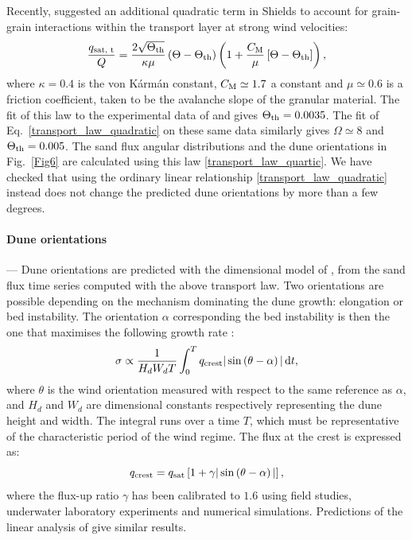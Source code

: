 Recently, \citet{Pahtz2020} suggested an additional quadratic term in Shields to account for grain-grain interactions within the transport layer at strong wind velocities:
%
\begin{equation}
\label{transport_law_quartic}
\frac{q_{\textup{sat, t}}}{Q} = \frac{2\sqrt{\Theta_{\textup{th}}}}{\kappa\mu}\left(\Theta - \Theta_{\textup{th}}\right)\left(1 +\frac{C_{\textup{M}}}{\mu}\left[\Theta - \Theta_{\textup{th}}\right]\right),
\end{equation}
%
where $\kappa = 0.4$ is the von K\'arm\'an constant, $C_{\rm M} \simeq 1.7$ a constant and $\mu \simeq 0.6$ is a friction coefficient, taken to be the avalanche slope of the granular material. The fit of this law to the experimental data of \citet{Creyssels2009} and \citet{Ho2011} gives $\Theta_{\textup{th}} = 0.0035$. The fit of Eq.~\ref{transport_law_quadratic} on these same data similarly gives $\Omega \simeq 8$ and $\Theta_{\textup{th}} = 0.005$. The sand flux angular distributions and the dune orientations in Fig.~\ref{Fig6} are calculated using this law \eqref{transport_law_quartic}. We have checked that using the ordinary linear relationship \eqref{transport_law_quadratic} instead does not change the predicted dune orientations by more than a few degrees.

\paragraph{Dune orientations} ---
Dune orientations are predicted with the dimensional model of \citet{Courrech2014}, from the sand flux time series computed with the above transport law. Two orientations are possible depending on the mechanism dominating the dune growth: elongation or bed instability. The orientation $\alpha$ corresponding the bed instability is then the one that maximises the following growth rate \citep{Rubin1987}:
%
\begin{equation}
\sigma \propto \frac{1}{H_{d} W_{d} T}\int_0^T  q_{\textup{crest}}\vert \sin\left(\theta - \alpha\right) \vert \, \textup{d}t,
\end{equation}
%
where $\theta$ is the wind orientation measured with respect to the same reference as $\alpha$, and $H_{d}$ and $W_{d}$ are dimensional constants respectively representing the dune height and width. The integral runs over a time $T$, which must be representative of the characteristic period of the wind regime. The flux at the crest is expressed as:
%
\begin{equation}
q_{\textup{crest}} = q_{\textup{sat}}\left[1 + \gamma\vert\sin\left(\theta - \alpha\right)\vert\right],
\end{equation}
%
where the flux-up ratio $\gamma$ has been calibrated to $1.6$ using field studies, underwater laboratory experiments and numerical simulations. Predictions of the linear analysis of \citet{Gadal2019} give similar results.

